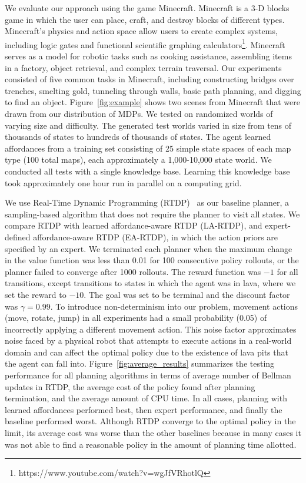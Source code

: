 We evaluate our approach using the game Minecraft.  Minecraft is a 3-D
blocks game in which the user can place, craft, and destroy blocks of
different types.  Minecraft's physics and action space allow users to
create complex systems, including logic gates and functional
scientific graphing
calculators\footnote{https://www.youtube.com/watch?v=wgJfVRhotlQ}.
Minecraft serves as a model for robotic tasks such as cooking
assistance, assembling items in a factory, object retrieval, and
complex terrain traversal.
Our experiments consisted of five common tasks in
Minecraft, including constructing bridges over trenches, smelting
gold, tunneling through walls, basic path planning, and digging to
find an object. Figure~\ref{fig:example} shows two scenes
from Minecraft that were drawn from our distribution of MDPs.  
We tested on randomized worlds of varying size and
difficulty. The generated test worlds varied in size from tens of
thousands of states to hundreds of thousands of states.  The agent
learned affordances from a training set consisting of 25 simple state
spaces of each map type (100 total maps), each approximately a
1,000-10,000 state world. We conducted all tests with a single
knowledge base. Learning this knowledge base took approximately one
hour run in parallel on a computing grid.


We use Real-Time Dynamic Programming (RTDP)~\cite{barto95} as our
baseline planner, a sampling-based algorithm that does not require the
planner to visit all states. We compare RTDP with learned
affordance-aware RTDP (LA-RTDP), and expert-defined affordance-aware
RTDP (EA-RTDP), in which the action priors are specified by an expert. 
We terminated each planner when the maximum change in
the value function was less than 0.01 for 100 consecutive policy
rollouts, or the planner failed to converge after 1000 rollouts.  The
reward function was $-1$ for all transitions, except transitions to
states in which the agent was in lava, where we set the reward to
$-10$. The goal was set to be terminal and the discount factor was
$\gamma = 0.99$.  To introduce non-determinism into our problem,
movement actions (move, rotate, jump) in all experiments had a small
probability (0.05) of incorrectly applying a different movement
action.  This noise factor approximates noise faced by a physical
robot that attempts to execute actions in a real-world domain and
can affect the optimal policy due to the existence of lava pits
that the agent can fall into. Figure~\ref{fig:average_results}
summarizes the testing performance for all planning algorithms
in terms of average number of Bellman updates in RTDP, the average
cost of the policy found after planning termination, and the average
amount of CPU time. In all cases, planning with learned affordances
performed best, then expert performance, and finally the baseline
performed worst. Although RTDP converge to the optimal policy in the
limit, its average cost was worse than the other baselines because
in many cases it was not able to find a reasonable policy in the
amount of planning time allotted.


